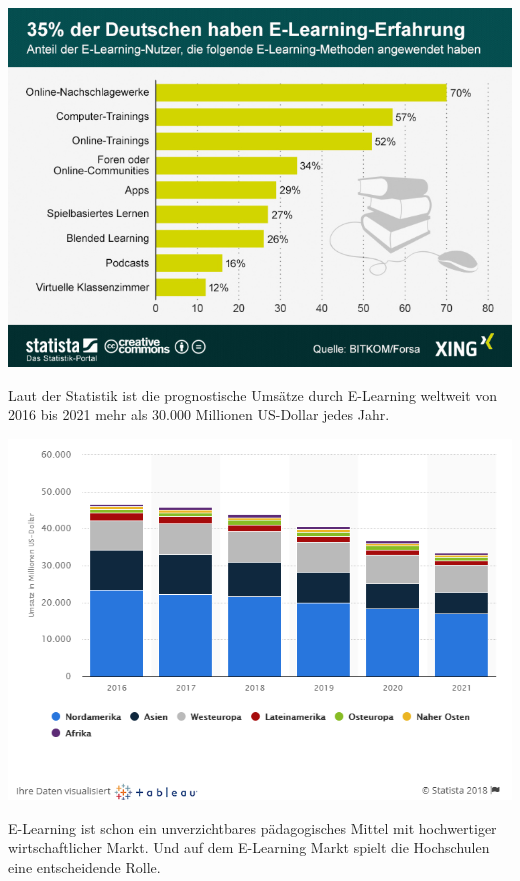 \includegraphics[width=\textwidth]{images/eLearningErfahrung.png}

Laut der Statistik ist die prognostische Umsätze durch E-Learning weltweit von 2016 bis 2021 mehr als 30.000 Millionen US-Dollar jedes Jahr.

\includegraphics[width=\textwidth]{images/umsatzDiagnose.png}

E-Learning ist schon ein unverzichtbares pädagogisches Mittel mit hochwertiger wirtschaftlicher Markt. Und auf dem E-Learning Markt spielt die Hochschulen eine entscheidende Rolle.

